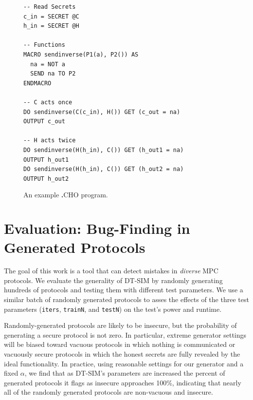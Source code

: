 \documentclass[acmlarge, manuscript, screen, review, anonymous, table]{acmart}
\newcommand{\langname}{\textsc{\textbf{.}CHO}\xspace}
\newcommand{\toolname}{\textsc{DT-SIM}\xspace}
\begin{document}
\begin{figure}[tbhp]
  \begin{mdframed}
      \begin{lstlisting}[language=cho]
-- Read Secrets
c_in = SECRET @C
h_in = SECRET @H

-- Functions
MACRO sendinverse(P1(a), P2()) AS
  na = NOT a
  SEND na TO P2
ENDMACRO

-- C acts once
DO sendinverse(C(c_in), H()) GET (c_out = na)
OUTPUT c_out

-- H acts twice
DO sendinverse(H(h_in), C()) GET (h_out1 = na)
OUTPUT h_out1
DO sendinverse(H(h_in), C()) GET (h_out2 = na)
OUTPUT h_out2
      \end{lstlisting}
  \end{mdframed}
  \caption{An example \langname program.}
  \label{fig:example-cho}
\end{figure}

\section{Evaluation: Bug-Finding in Generated Protocols}
\label{sec:random-protocols}

The goal of this work is a tool that can detect mistakes in \emph{diverse} MPC protocols.
We evaluate the generality of \toolname by randomly generating hundreds of protocols and testing them with different test parameters.
We use a similar batch of randomly generated protocols to asses the effects of the three test parameters
(\texttt{iters}, \texttt{trainN}, and \texttt{testN})
on the test's power and runtime.

Randomly-generated protocols are likely to be insecure, but the probability of generating a secure protocol is not zero.
In particular, extreme generator settings will be biased toward vacuous protocols in which nothing is communicated
or vacuously secure protocols in which the honest secrets are fully revealed by the ideal functionality.
In practice, using reasonable settings for our generator and a fixed $\alpha$,
we find that as \toolname's parameters are increased the percent of generated protocols it flags as insecure approaches 100\%,
indicating that nearly all of the randomly generated protocols are non-vacuous and insecure.
\end{document}
